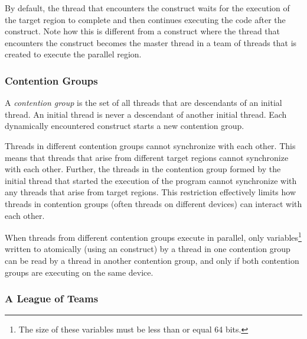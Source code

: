 By default, the thread that encounters the  construct waits for
the execution of the target region to complete and then continues executing the
code after the  construct.  Note how this is different from a
 construct where the thread that encounters the construct
becomes the master thread in a team of threads that is created to execute the
parallel region.  

\subsubsection{Contention Groups}
\label{ssec:06.contention-groups}

A \emph{contention group} is the set of all threads that are descendants of an
initial thread.  An initial thread is never a descendant of another initial
thread.  Each dynamically encountered  construct starts a new
contention group.  

Threads in different contention groups cannot synchronize with
each other.  This means that threads that arise from different target regions
cannot synchronize with each other.  Further, the threads in the contention
group formed by the initial thread that started the execution of the program
cannot synchronize with any threads that arise from target regions.  This
restriction effectively limits how threads in contention groups (often threads
on different devices) can interact with each other.

When threads from different contention groups execute in parallel, only
variables\footnote{The size of these variables must be less than or equal 64 bits.} 
written to atomically 
(using an  construct)
by a thread in one contention group can be read by a thread in another contention group, and only
if both contention groups are executing on the same device.

\subsubsection{A League of Teams}
\label{ssec:06.league-of-teams}

